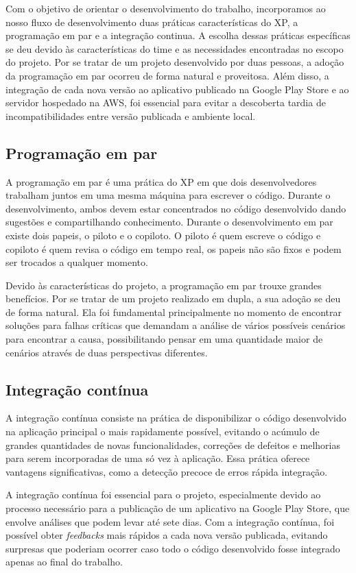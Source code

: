 Com o objetivo de orientar o desenvolvimento do trabalho, incorporamos ao nosso fluxo de desenvolvimento duas práticas características do XP, a programação em par e a integração continua. A escolha dessas práticas específicas se deu devido às características do time e as necessidades encontradas no escopo do projeto. Por se tratar de um projeto desenvolvido por duas pessoas, a adoção da programação em par ocorreu de forma natural e proveitosa. Além disso, a integração de cada nova versão ao aplicativo publicado na Google Play Store e ao servidor hospedado na AWS, foi essencial para evitar a descoberta tardia de incompatibilidades entre versão publicada e ambiente local.

\subsection{Programação em par}
A programação em par é uma prática do XP em que dois desenvolvedores trabalham juntos em uma mesma máquina para escrever o código. Durante o desenvolvimento, ambos devem estar concentrados no código desenvolvido dando sugestões e compartilhando conhecimento. Durante o desenvolvimento em par existe dois papeis, o piloto e o copiloto. O piloto é quem escreve o código e copiloto é quem revisa o código em tempo real, os papeis não são fixos e podem ser trocados a qualquer momento.

Devido às características do projeto, a programação em par trouxe grandes benefícios. Por se tratar de um projeto realizado em dupla, a sua adoção se deu de forma natural. Ela foi fundamental principalmente no momento de encontrar soluções para falhas críticas que demandam a análise de vários possíveis cenários para encontrar a causa, possibilitando pensar em uma quantidade maior de cenários através de duas perspectivas diferentes.

\subsection{Integração contínua}
A integração contínua consiste na prática de disponibilizar o código desenvolvido na aplicação principal o mais rapidamente possível, evitando o acúmulo de grandes quantidades de novas funcionalidades, correções de defeitos e melhorias para serem incorporadas de uma só vez à aplicação. Essa prática oferece vantagens significativas, como a detecção precoce de erros rápida integração.

A integração contínua foi essencial para o projeto, especialmente devido ao processo necessário para a publicação de um aplicativo na Google Play Store, que envolve análises que podem levar até sete dias. Com a integração contínua, foi possível obter \textit{feedbacks} mais rápidos a cada nova versão publicada, evitando surpresas que poderiam ocorrer caso todo o código desenvolvido fosse integrado apenas ao final do trabalho.

